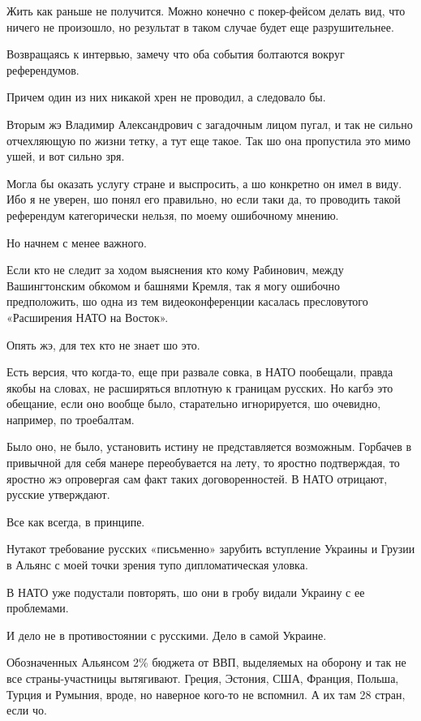 \begin{multicols}{2}
Жить как раньше не получится. Можно конечно с покер-фейсом делать вид, что
ничего не произошло, но результат в таком случае будет еще разрушительнее.

Возвращаясь к интервью, замечу что оба события болтаются вокруг референдумов.

Причем один из них никакой хрен не проводил, а следовало бы.

Вторым жэ Владимир Александрович с загадочным лицом пугал, и так не сильно
отчехляющую по жизни тетку, а тут еще такое. Так шо она пропустила это мимо
ушей, и вот сильно зря.

Могла бы оказать услугу стране и выспросить, а шо конкретно он имел в виду. Ибо
я не уверен, шо понял его правильно, но если таки да, то проводить такой
референдум категорически нельзя, по моему ошибочному мнению.

Но начнем с менее важного.

Если кто не следит за ходом выяснения кто кому Рабинович, между Вашингтонским
обкомом и башнями Кремля, так я могу ошибочно предположить, шо одна из тем
видеоконференции касалась пресловутого «Расширения НАТО на Восток».

Опять жэ, для тех кто не знает шо это.

Есть версия, что когда-то, еще при развале совка, в НАТО пообещали, правда
якобы на словах, не расширяться вплотную к границам русских. Но кагбэ это
обещание, если оно вообще было, старательно игнорируется, шо очевидно,
например, по троебалтам.

Было оно, не было, установить истину не представляется возможным. Горбачев в
привычной для себя манере переобувается на лету, то яростно подтверждая, то
яростно жэ опровергая сам факт таких договоренностей. В НАТО отрицают, русские
утверждают.

Все как всегда, в принципе.

Нутакот требование русских «письменно» зарубить вступление Украины и Грузии в
Альянс с моей точки зрения тупо дипломатическая уловка.

В НАТО уже подустали повторять, шо они в гробу видали Украину с ее проблемами.

И дело не в противостоянии с русскими. Дело в самой Украине.

Обозначенных Альянсом 2\% бюджета от ВВП, выделяемых на оборону и так не все
страны-участницы вытягивают. Греция, Эстония, США, Франция, Польша, Турция и
Румыния, вроде, но наверное кого-то не вспомнил. А их там 28 стран, если чо.


\end{multicols}
